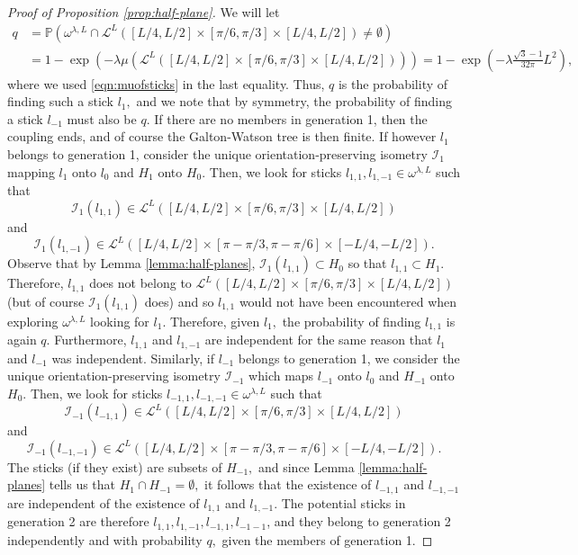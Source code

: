 \documentclass[10pt,a4paper]{amsart}
\newcommand{\BP}{{\mathbb{P}}}
\newcommand{\CI}{{\mathcal{I}}}
\newcommand{\CL}{{\mathcal{L}}}
\begin{document}
\begin{proof}[Proof of Proposition \ref{prop:half-plane}]
We will let 
\begin{align} \label{eqn:qdef}
 q& =\BP(\omega^{\lambda,L}\cap \CL^L([L/4,L/2]\times [\pi/6,\pi/3]\times [L/4,L/2])\neq \emptyset) \\
& =1-\exp(-\lambda \mu(\CL^L([L/4,L/2]\times [\pi/6,\pi/3]\times [L/4,L/2]))) =1-\exp\left(-\lambda \frac{\sqrt{3}-1}{32 \pi}L^2\right), \nonumber
\end{align}
where we used \eqref{eqn:muofsticks} in the last equality. Thus, $q$ is the probability 
of finding such a stick $l_1,$ and we note that by symmetry, the probability of finding 
a stick $l_{-1}$ must also be $q.$
If there are no members in generation 1, then the coupling ends, and of course the Galton-Watson 
tree is then finite. If however $l_1$ belongs to generation 1, consider the unique 
orientation-preserving isometry 
$\CI_1$ mapping $l_1$ onto $l_0$ and $H_1$ onto $H_0.$ Then, we look for sticks 
$l_{1,1},l_{1,-1} \in \omega^{\lambda,L}$ such that 
\[
\CI_1(l_{1,1})\in \CL^L([L/4,L/2]\times [\pi/6,\pi/3]\times [L/4,L/2])
\]
and 
\[
\CI_1(l_{1,-1})\in \CL^L([L/4,L/2]\times [\pi-\pi/3,\pi-\pi/6]\times [-L/4,-L/2]).
\]
Observe that by Lemma \ref{lemma:half-planes},
$\CI_1(l_{1,1})\subset H_0$ so that $l_{1,1}\subset H_1.$ Therefore, 
$l_{1,1}$ does not belong to $\CL^L([L/4,L/2]\times [\pi/6,\pi/3]\times [L/4,L/2])$ 
(but of course $\CI_1(l_{1,1})$ does) and so $l_{1,1}$
would not have been encountered when exploring $\omega^{\lambda,L}$ looking for $l_1.$ Therefore, 
given $l_1,$ the probability of finding $l_{1,1}$ is again $q.$ Furthermore, $l_{1,1}$ and $l_{1,-1}$
are independent for the same reason that $l_1$ and $l_{-1}$ was independent.
Similarly, if $l_{-1}$ belongs to generation 1, 
we consider the unique orientation-preserving isometry $\CI_{-1}$ which maps $l_{-1}$ onto $l_0$ and 
$H_{-1}$ onto $H_0.$ Then, we look for sticks $l_{-1,1},l_{-1,-1} \in \omega^{\lambda,L}$ 
such that 
\[
\CI_{-1}(l_{-1,1})\in \CL^L([L/4,L/2]\times [\pi/6,\pi/3]\times [L/4,L/2])
\]
and 
\[
\CI_{-1}(l_{-1,-1})\in \CL^L([L/4,L/2]\times [\pi-\pi/3,\pi-\pi/6]\times [-L/4,-L/2]).
\]
The sticks (if they exist) are subsets of 
$H_{-1},$ and since Lemma \ref{lemma:half-planes} tells us that $H_1 \cap H_{-1}=\emptyset,$
it follows that the existence of $l_{-1,1}$ and $l_{-1,-1}$ are independent of the existence
of $l_{1,1}$ and $l_{1,-1}.$ The potential sticks in generation 2 are therefore 
$l_{1,1},l_{1,-1},l_{-1,1},l_{-1-1}$, and they belong to generation 2
independently and with probability $q,$ given the members of generation 1.


\end{proof}
\end{document}
